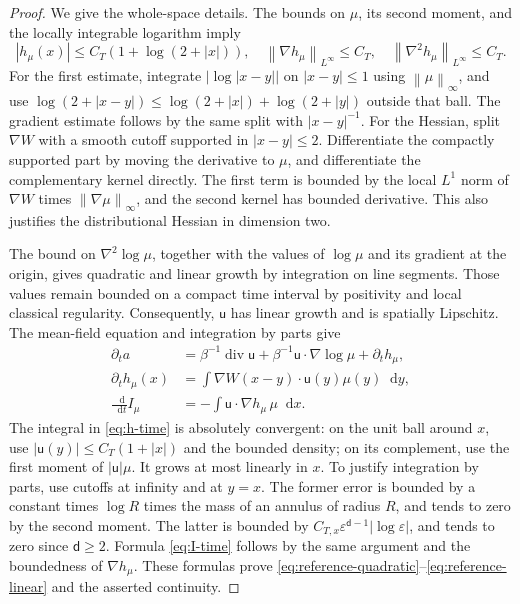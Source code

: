 \documentclass[11pt,reqno]{amsart}
\numberwithin{equation}{section}
\theoremstyle{definition}
\theoremstyle{remark}
\renewcommand{\d}{\mathsf d}
\renewcommand{\u}{\mathsf u}
\newcommand{\diver}{\operatorname{div}}
\newcommand{\dd}{\mathop{}\!\mathrm d}
\newcommand{\norm}[1]{\left\lVert#1\right\rVert}
\begin{document}
\begin{proof}
We give the whole-space details. The bounds on $\mu$, its second moment, and the locally integrable logarithm imply
\begin{equation}\label{eq:potential-growth}
 |h_\mu(x)|\leq C_T(1+\log(2+|x|)),\quad
 \norm{\nabla h_\mu}_{L^\infty}\leq C_T,\quad
 \norm{\nabla^2h_\mu}_{L^\infty}\leq C_T.
\end{equation}
For the first estimate, integrate $|\log|x-y||$ on $|x-y|\leq1$ using $\norm{\mu}_\infty$, and use
$\log(2+|x-y|)\leq\log(2+|x|)+\log(2+|y|)$ outside that ball. The gradient estimate follows by the same split with $|x-y|^{-1}$. For the Hessian, split $\nabla W$ with a smooth cutoff supported in $|x-y|\leq2$. Differentiate the compactly supported part by moving the derivative to $\mu$, and differentiate the complementary kernel directly. The first term is bounded by the local $L^1$ norm of $\nabla W$ times $\norm{\nabla\mu}_\infty$, and the second kernel has bounded derivative. This also justifies the distributional Hessian in dimension two.

The bound on $\nabla^2\log\mu$, together with the values of $\log\mu$ and its gradient at the origin, gives quadratic and linear growth by integration on line segments. Those values remain bounded on a compact time interval by positivity and local classical regularity. Consequently, $\u$ has linear growth and is spatially Lipschitz. The mean-field equation and integration by parts give
\begin{align}
 \partial_t a&=\beta^{-1}\diver \u+
         \beta^{-1}\u\cdot\nabla\log\mu+\partial_t h_\mu,
 \label{eq:a-time}\\
 \partial_t h_\mu(x)&=\int\nabla W(x-y)\cdot \u(y)\mu(y)\dd y,
 \label{eq:h-time}\\
 \frac{\dd}{\dd t}I_\mu&=-\int \u\cdot\nabla h_\mu\,\mu\dd x.
 \label{eq:I-time}
\end{align}
The integral in \eqref{eq:h-time} is absolutely convergent: on the unit ball around $x$, use $|\u(y)|\leq C_T(1+|x|)$ and the bounded density; on its complement, use the first moment of $|\u|\mu$. It grows at most linearly in $x$. To justify integration by parts, use cutoffs at infinity and at $y=x$. The former error is bounded by a constant times $\log R$ times the mass of an annulus of radius $R$, and tends to zero by the second moment. The latter is bounded by $C_{T,x}\varepsilon^{\d-1}|\log\varepsilon|$, and tends to zero since $\d\geq2$. Formula \eqref{eq:I-time} follows by the same argument and the boundedness of $\nabla h_\mu$. These formulas prove \eqref{eq:reference-quadratic}--\eqref{eq:reference-linear} and the asserted continuity.


\end{proof}
\end{document}
